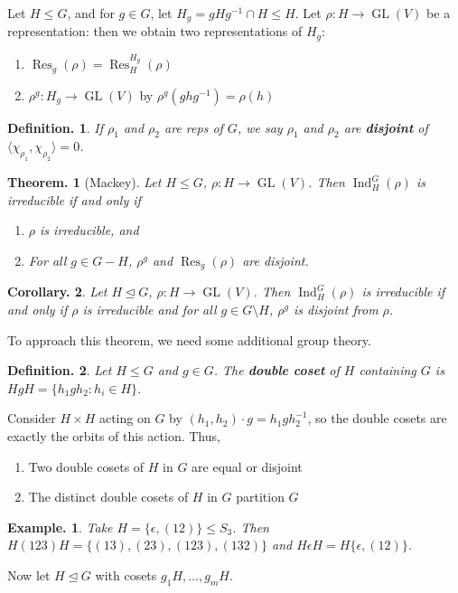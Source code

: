 \documentclass[11pt, a4paper]{memoir}
\theoremstyle{change}
\newtheorem{theorem}{Theorem.}[section]
\newtheorem{corollary}[theorem]{Corollary.}
\theoremstyle{plain}
\theoremstyle{nonumberplain}
\newtheorem{definition}{Definition.}
\newtheorem{example}{Example.}
\DeclareMathOperator{\GL}{GL}
\DeclareMathOperator{\Res}{Res}
\DeclareMathOperator{\Ind}{Ind}
\numberwithin{equation}{section}
\begin{document}
Let $H\leq G$, and for $g\in G$, let $H_g=gHg^{-1}\cap H\leq H$.
Let $\rho:H\to\GL(V)$ be a representation: then we obtain two representations of $H_g$:
\begin{enumerate}[nl]
    \item $\Res_g(\rho)=\Res_H^{H_g}(\rho)$
    \item $\rho^g:H_g\to\GL(V)$ by $\rho^g(ghg^{-1})=\rho(h)$
\end{enumerate}
\begin{definition}
    If $\rho_1$ and $\rho_2$ are reps of $G$, we say $\rho_1$ and $\rho_2$ are \textbf{disjoint} of $\langle\chi_{\rho_1},\chi_{\rho_2}\rangle=0$.
\end{definition}
\begin{theorem}[Mackey]
    Let $H\leq G$, $\rho:H\to\GL(V)$.
    Then $\Ind_H^G(\rho)$ is irreducible if and only if
    \begin{enumerate}[nl]
        \item $\rho$ is irreducible, and
        \item For all $g\in G-H$, $\rho^g$ and $\Res_g(\rho)$ are disjoint.
    \end{enumerate}
\end{theorem}
\begin{corollary}
    Let $H\trianglelefteq G$, $\rho:H\to\GL(V)$.
    Then $\Ind_H^G(\rho)$ is irreducible if and only if $\rho$ is irreducible and for all $g\in G\setminus H$, $\rho^g$ is disjoint from $\rho$.
\end{corollary}
To approach this theorem, we need some additional group theory.
\begin{definition}
    Let $H\leq G$ and $g\in G$.
    The \textbf{double coset} of $H$ containing $G$ is $HgH=\{h_1gh_2:h_i\in H\}$.
\end{definition}
Consider $H\times H$ acting on $G$ by $(h_1,h_2)\cdot g=h_1gh_2^{-1}$, so the double cosets are exactly the orbits of this action.
Thus,
\begin{enumerate}[nl]
    \item Two double cosets of $H$ in $G$ are equal or disjoint
    \item The distinct double cosets of $H$ in $G$ partition $G$
\end{enumerate}
\begin{example}
    Take $H=\{\epsilon,(12)\}\leq S_3$.
    Then $H(123)H=\{(13),(23),(123),(132)\}$ and $H\epsilon H=H\{\epsilon,(12)\}$.
\end{example}
Now let $H\trianglelefteq G$ with cosets $g_1H,\ldots,g_mH$.
\end{document}
